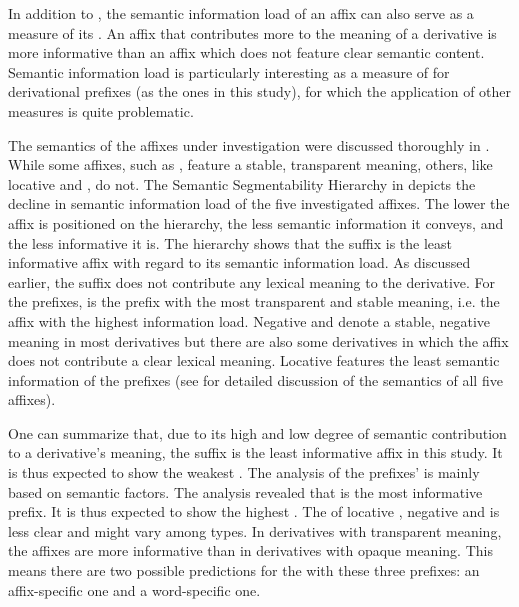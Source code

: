 {{%

In addition to , the semantic information load of an affix can also serve as a measure of its . An affix that contributes more to the meaning of a derivative is more informative than an affix which does not feature clear semantic content. Semantic information load is particularly interesting as a measure of  for derivational prefixes (as the ones in this study), for which the application of other  measures is quite problematic. 

The semantics of the affixes under investigation were discussed thoroughly in . While some affixes, such as , feature a stable, transparent meaning, others, like locative  and , do not. The Semantic Segmentability Hierarchy in  depicts the decline in semantic information load of the five investigated affixes.
 The lower the affix is positioned on the hierarchy, the less semantic information it conveys, and the less informative it is. The hierarchy shows that the suffix  is the least informative affix with regard to its semantic information load.  As discussed earlier, the suffix does not contribute any lexical meaning to the derivative. 
 For the prefixes,  is the prefix with the most transparent and stable meaning, i.e. the affix with the highest information load. Negative  and  denote a stable, negative meaning in most derivatives but there are also some derivatives in which the affix does not contribute a clear lexical meaning. Locative  features the least semantic information of the prefixes (see  for detailed discussion of the semantics of all five affixes). 

One can summarize that, due to its high  and low degree of semantic contribution to a derivative's meaning, the suffix  is the least informative affix in this study. It is thus expected to show the weakest . 
The analysis of the prefixes'  is mainly based on semantic factors. 
The analysis revealed that  is the most informative prefix. It is thus expected to show the highest . 
The  of locative , negative  and  is less clear and might vary among types. In derivatives with transparent meaning, the affixes are more informative than in derivatives with opaque meaning. This means there are two possible predictions for the  with these three prefixes: an affix-specific one and a word-specific one. 

}}
